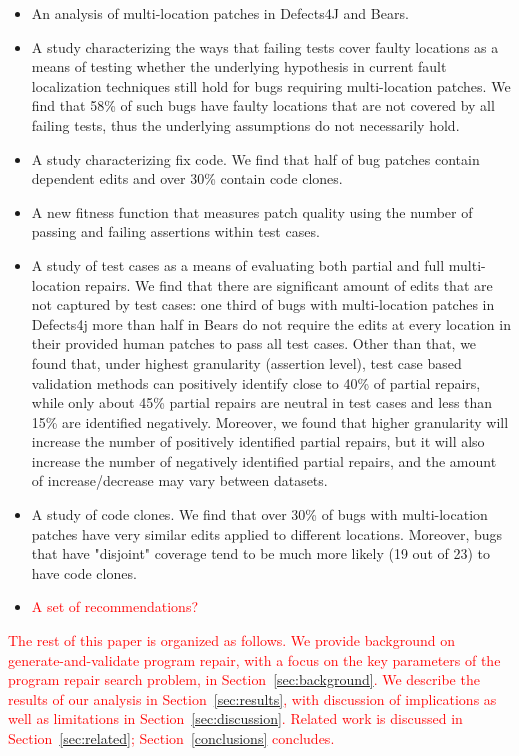 \documentclass[sigconf, timestamp-false, anonymous=true]{acmart}
\newcommand\todo[1]{\textcolor{red}{#1}}
\begin{document}
\begin{itemize}
\item An analysis of multi-location patches in Defects4J and Bears.
\item A study characterizing the ways that failing tests cover faulty locations
  as a means of testing whether the underlying hypothesis in current fault
  localization techniques still hold for bugs requiring multi-location
  patches. We find that 58\% of such bugs have faulty locations that are not
  covered by all failing tests, thus the underlying assumptions do not
  necessarily hold.
\item A study characterizing fix code.  We find that half of bug patches contain
  dependent edits and over 30\% contain code clones.
\item A new fitness function that measures patch quality using the number of
  passing and failing assertions within test cases.
\item A study of test cases as a means of evaluating both partial and full
  multi-location repairs.  We find that there are significant amount of edits
  that are not captured by test cases: one third of bugs with multi-location
  patches in Defects4j more than half in Bears do not require the edits at every
  location in their provided human patches to pass all test cases. Other than
  that, we found that, under highest granularity (assertion level), test case
  based validation methods can positively identify close to 40\% of partial repairs,
  while only about 45\% partial repairs are neutral in test cases and less than
  15\% are identified negatively. Moreover, we found that higher granularity
  will increase the number of positively identified partial repairs, but it will
  also increase the number of negatively identified partial repairs, and the
  amount of increase/decrease may vary between datasets.
\item A study of code clones. We find that over 30\% of bugs with multi-location
  patches have very similar edits applied to different locations. Moreover, bugs
  that have "disjoint" coverage tend to be much more likely (19 out of 23) to
  have code clones.
\item \todo{A set of recommendations?}
\end{itemize}

\todo{The rest of this paper is organized as follows.  We provide background on
generate-and-validate program repair, with a focus on the key parameters of the
program repair search problem, in Section~\ref{sec:background}.  We describe the
results of our analysis in Section~\ref{sec:results}, with discussion of
implications as well as limitations in Section~\ref{sec:discussion}.  Related
work is discussed in Section~\ref{sec:related}; Section~\ref{conclusions}
concludes.}
\end{document}
